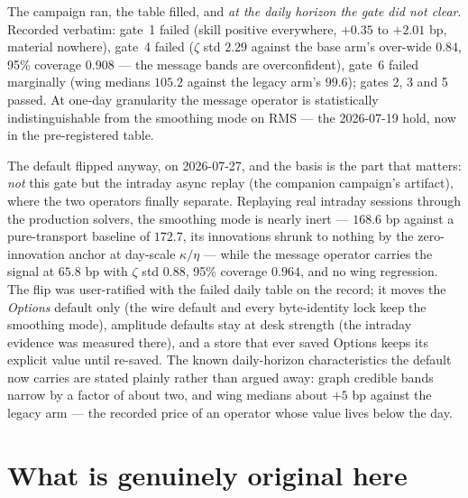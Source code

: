 \documentclass[11pt]{article}
\begin{document}
The campaign ran, the table filled, and \emph{at the daily horizon the
gate did not clear}.  Recorded verbatim: gate~1 failed (skill positive
everywhere, $+0.35$ to $+2.01$ bp, material nowhere), gate~4 failed
($\zeta$ std $2.29$ against the base arm's over-wide $0.84$, 95\%
coverage $0.908$ --- the message bands are overconfident), gate~6
failed marginally (wing medians $105.2$ against the legacy arm's
$99.6$); gates 2, 3 and 5 passed.  At one-day granularity the message
operator is statistically indistinguishable from the smoothing mode on
RMS --- the 2026-07-19 hold, now in the pre-registered table.

The default flipped anyway, on 2026-07-27, and the basis is the part
that matters: \emph{not} this gate but the intraday async replay
(the companion campaign's artifact), where the two operators finally
separate.  Replaying real intraday sessions through the production
solvers, the smoothing mode is nearly inert --- $168.6$ bp against a
pure-transport baseline of $172.7$, its innovations shrunk to nothing
by the zero-innovation anchor at day-scale $\kappa/\eta$ --- while the
message operator carries the signal at $65.8$ bp with $\zeta$ std
$0.88$, 95\% coverage $0.964$, and no wing regression.  The flip was
user-ratified with the failed daily table on the record; it moves the
\emph{Options} default only (the wire default and every byte-identity
lock keep the smoothing mode), amplitude defaults stay at desk
strength (the intraday evidence was measured there), and a store that
ever saved Options keeps its explicit value until re-saved.  The known
daily-horizon characteristics the default now carries are stated
plainly rather than argued away: graph credible bands narrow by a
factor of about two, and wing medians about $+5$ bp against the legacy
arm --- the recorded price of an operator whose value lives below the
day.

\section{What is genuinely original here}
\label{sec:original}
\end{document}
